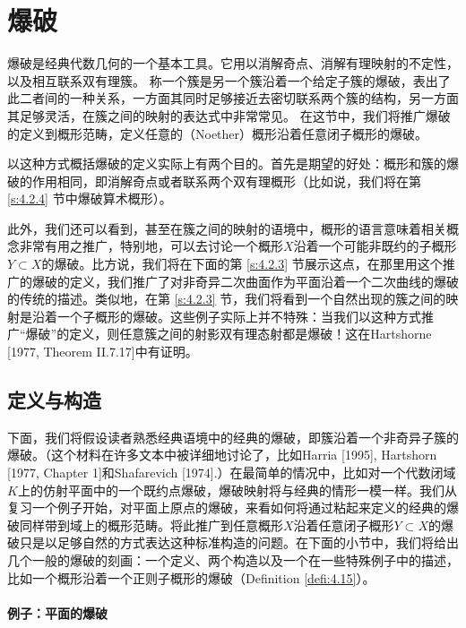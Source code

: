 \section{爆破}\label{s:4.2}

爆破是经典代数几何的一个基本工具。它用以消解奇点、消解有理映射的不定性，以及相互联系双有理簇。
称一个簇是另一个簇沿着一个给定子簇的爆破，表出了此二者间的一种关系，一方面其同时足够接近去密切联系两个簇的结构，另一方面其足够灵活，在簇之间的映射的表达式中非常常见。
在这节中，我们将推广爆破的定义到概形范畴，定义任意的（Noether）概形沿着任意闭子概形的爆破。

以这种方式概括爆破的定义实际上有两个目的。首先是期望的好处：概形和簇的爆破的作用相同，即消解奇点或者联系两个双有理概形（比如说，我们将在第 \ref{s:4.2.4} 节中爆破算术概形）。

此外，我们还可以看到，甚至在簇之间的映射的语境中，概形的语言意味着相关概念非常有用之推广，特别地，可以去讨论一个概形$X$沿着一个可能非既约的子概形$Y\subset X$的爆破。比方说，我们将在下面的第 \ref{s:4.2.3} 节展示这点，在那里用这个推广的爆破的定义，我们推广了对非奇异二次曲面作为平面沿着一个二次曲线的爆破的传统的描述。类似地，在第 \ref{s:4.2.3} 节，我们将看到一个自然出现的簇之间的映射是沿着一个子概形的爆破。这些例子实际上并不特殊：当我们以这种方式推广“爆破”的定义，则任意簇之间的射影双有理态射都是爆破！这在Hartshorne [1977, Theorem II.7.17]中有证明。

\subsection{定义与构造}\label{s:4.2.1}


下面，我们将假设读者熟悉经典语境中的经典的爆破，即簇沿着一个非奇异子簇的爆破。（这个材料在许多文本中被详细地讨论了，比如Harria [1995], Hartshorn [1977, Chapter 1]和Shafarevich [1974].）在最简单的情况中，比如对一个代数闭域$K$上的仿射平面中的一个既约点爆破，爆破映射将与经典的情形一模一样。我们从复习一个例子开始，对平面上原点的爆破，来看如何将通过粘起来定义的经典的爆破同样带到域上的概形范畴。将此推广到任意概形$X$沿着任意闭子概形$Y\subset X$的爆破只是以足够自然的方式表达这种标准构造的问题。在下面的小节中，我们将给出几个一般的爆破的刻画：一个定义、两个构造以及一个在一些特殊例子中的描述，比如一个概形沿着一个正则子概形的爆破（Definition \ref{defi:4.15}）。

\paragraph*{例子：平面的爆破}

